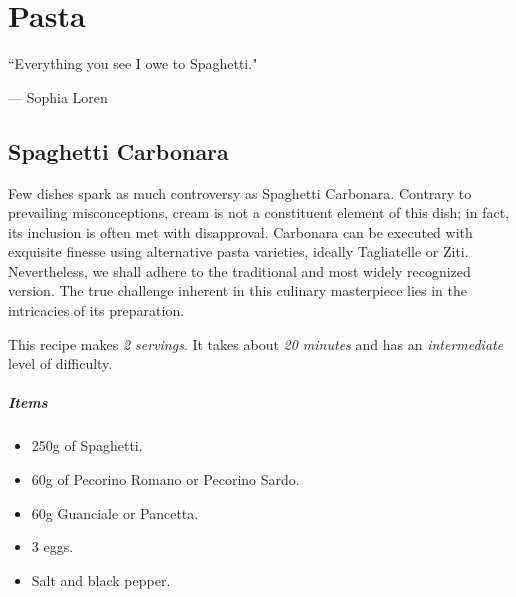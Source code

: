 \chapter{Pasta}
\label{pasta}
\epigraph{``Everything you see I owe to Spaghetti."}{--- \textup{Sophia Loren}}

\section{Spaghetti Carbonara}
\label{Spaghetticarbonara}
Few dishes spark as much controversy as Spaghetti Carbonara. Contrary to prevailing misconceptions, cream is not a constituent element of this dish; in fact, its inclusion is often met with disapproval. Carbonara can be executed with exquisite finesse using alternative pasta varieties, ideally Tagliatelle or Ziti. Nevertheless, we shall adhere to the traditional and most widely recognized version. The true challenge inherent in this culinary masterpiece lies in the intricacies of its preparation.

This recipe makes \emph{2 servings}. It takes about \emph{20 minutes} and has an \emph{intermediate} level of difficulty. 

\paragraph{Items}
\begin{itemize}[noitemsep]
    \item[\ding{182}] 250g of Spaghetti.
    \item[\ding{183}] 60g of Pecorino Romano or Pecorino Sardo.
    \item[\ding{184}] 60g Guanciale or Pancetta.
    \item[\ding{185}] 3 eggs.
    \item[\ding{186}] Salt and black pepper.
\end{itemize}


